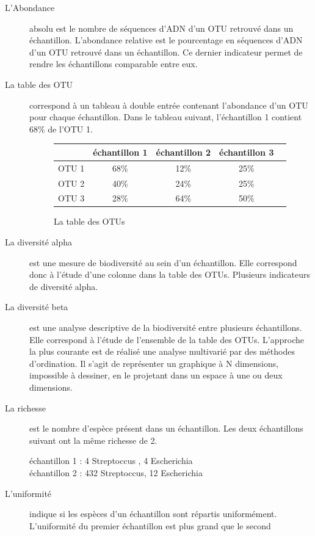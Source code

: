 \documentclass[12pt,a4paper]{article}
\begin{document}
\begin{description}
\item[L'Abondance] absolu est le nombre de séquences d’ADN d’un OTU retrouvé dans un échantillon. 
L’abondance relative est le pourcentage en séquences d'ADN d'un OTU retrouvé dans un échantillon. Ce dernier indicateur permet de rendre les échantillons comparable entre eux.


\item[La table des OTU] correspond à un tableau à double entrée contenant l’abondance d’un OTU pour chaque échantillon. Dans le tableau suivant, l'échantillon 1 contient 68\% de l'OTU 1.

\begin{figure}
\begin{center}
\begin{tabular}{|l|c|c|c|c}
  \hline
   & échantillon 1 & échantillon 2 & échantillon 3  \\
  \hline
  OTU 1 & 68\% & 12\% & 25\% \\
  OTU 2 & 40\% & 24\% & 25\% \\
  OTU 3 & 28\% & 64\% & 50\% \\

  \hline
\end{tabular}
\end{center}
\caption{La table des OTUs}
\end{figure}

\item[La diversité alpha] est une mesure de biodiversité au sein d’un échantillon. Elle correspond donc à l’étude d’une colonne dans la table des OTUs. Plusieurs indicateurs de diversité alpha.

\item[La diversité beta] est une analyse descriptive de la biodiversité entre plusieurs échantillons. Elle correspond à l’étude de l’ensemble de la table des OTUs. L’approche la plus courante est de réalisé une analyse multivarié par des méthodes d’ordination. Il s’agit de représenter un graphique à N dimensions, impossible à dessiner, en le projetant dans un espace à une ou deux dimensions.


\item[La richesse] est le nombre d’espèce présent dans un échantillon. Les deux échantillons suivant ont la même richesse de 2. 

échantillon 1  : 4 Streptoccus , 4 Escherichia  \\ 
échantillon 2 : 432 Streptoccus, 12 Escherichia 

\item[L'uniformité] indique si les espèces d’un échantillon sont répartis uniformément.
L'uniformité du premier échantillon est plus grand que le second


\end{description}
\end{document}
